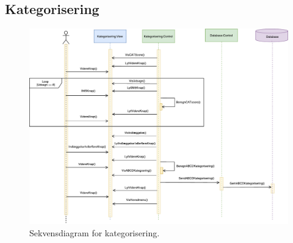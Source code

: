 \subsection*{Kategorisering}

\begin{figure} [H]
\centering
\includegraphics[width=1\textwidth]{figures/Sek/SEKKategorisering}
\caption{Sekvensdiagram for kategorisering.}
\label{fig:SEKKategorisering}
\end{figure}